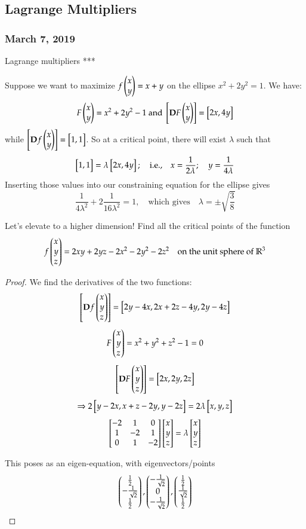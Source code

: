 \subsection{Lagrange Multipliers}
\subsubsection*{March 7, 2019}

\begin{defn}{Lagrange multipliers}
	***
\end{defn}

\example Suppose we want to maximize $f\begin{pmatrix} x \\ y \end{pmatrix} = x + y$ on the ellipse $x^2 + 2y^2 = 1$. We have: 
\[F\begin{pmatrix} x \\ y \end{pmatrix} = x^2+2y^2-1 \text{ and }\begin{bmatrix} \textbf{D}F\begin{pmatrix} x \\ y \end{pmatrix} \end{bmatrix}=\begin{bmatrix} 2x, 4y \end{bmatrix}\]
while $\begin{bmatrix} \textbf{D}f\begin{pmatrix} x \\ y \end{pmatrix} \end{bmatrix} = \begin{bmatrix} 1, 1 \end{bmatrix}$. So at a critical point, there will exist $\lambda$ such that
\[\begin{bmatrix} 1, 1 \end{bmatrix}=\lambda\begin{bmatrix} 2x, 4y \end{bmatrix}; \quad\text{i.e.,}\quad x=\frac{1}{2\lambda}; \quad y=\frac{1}{4\lambda} \]
Inserting those values into our constraining equation for the ellipse gives
\[\frac{1}{4\lambda^2}+2\frac{1}{16\lambda^2}=1,\quad \text{which gives}\quad \lambda=\pm \sqrt{\frac{3}{8}} \]

 Let's elevate to a higher dimension! Find all the critical points of the function
\[f\begin{pmatrix} x \\ y \\ z \end{pmatrix} = 2xy+2yz-2x^2-2y^2-2z^2\quad \text{on the unit sphere of }\mathbb{R}^3\]
\begin{proof}
	We find the derivatives of the two functions: 
	\[\begin{bmatrix} \textbf{D}f\begin{pmatrix} x \\ y \\ z \end{pmatrix} \end{bmatrix}=\begin{bmatrix} 2y-4x, 2x+2z-4y, 2y-4z \end{bmatrix}\]
	\[F\begin{pmatrix} x \\ y \\ z \end{pmatrix}=x^2+y^2+z^2-1=0\]
	\[\begin{bmatrix} \textbf{D}F\begin{pmatrix} x \\ y \\ z \end{pmatrix} \end{bmatrix}=\begin{bmatrix} 2x, 2y, 2z \end{bmatrix}\]
	\[\Rightarrow 2\begin{bmatrix} y-2x, x+z-2y, y-2z \end{bmatrix} = 2\lambda \begin{bmatrix} x, y, z \end{bmatrix}\]
	\[\begin{bmatrix} -2 & 1 & 0 \\ 1 & -2 & 1 \\ 0 & 1 & -2 \end{bmatrix}\begin{bmatrix} x \\ y \\ z \end{bmatrix}=\lambda \begin{bmatrix} x \\ y \\ z \end{bmatrix}\]
	
	This poses as an eigen-equation, with eigenvectors/points
	\[\begin{pmatrix} \frac{1}{2} \\ -\frac{1}{\sqrt{2}} \\ \frac{1}{2} \end{pmatrix}, \begin{pmatrix} -\frac{1}{\sqrt{2}} \\ 0 \\ -\frac{1}{\sqrt{2}} \end{pmatrix},\begin{pmatrix} \frac{1}{2} \\ \frac{1}{\sqrt{2}} \\ \frac{1}{2} \end{pmatrix}\]
\end{proof}

